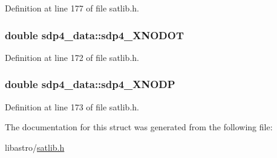 Definition at line 177 of file satlib.\-h.

\hypertarget{structsdp4__data_ad37f4d07e3a60b7b59fcfb2de095da4f}{
\subsubsection[{sdp4\-\_\-\-X\-N\-O\-D\-O\-T}]{\setlength{\rightskip}{0pt plus 5cm}double sdp4\-\_\-data\-::sdp4\-\_\-\-X\-N\-O\-D\-O\-T}}\label{structsdp4__data_ad37f4d07e3a60b7b59fcfb2de095da4f}


Definition at line 172 of file satlib.\-h.

\hypertarget{structsdp4__data_ac869c664fde599dc5c467568d0ab4974}{
\subsubsection[{sdp4\-\_\-\-X\-N\-O\-D\-P}]{\setlength{\rightskip}{0pt plus 5cm}double sdp4\-\_\-data\-::sdp4\-\_\-\-X\-N\-O\-D\-P}}\label{structsdp4__data_ac869c664fde599dc5c467568d0ab4974}


Definition at line 173 of file satlib.\-h.



The documentation for this struct was generated from the following file\-:\begin{DoxyCompactItemize}
\item 
libastro/\hyperlink{satlib_8h}{satlib.\-h}\end{DoxyCompactItemize}
